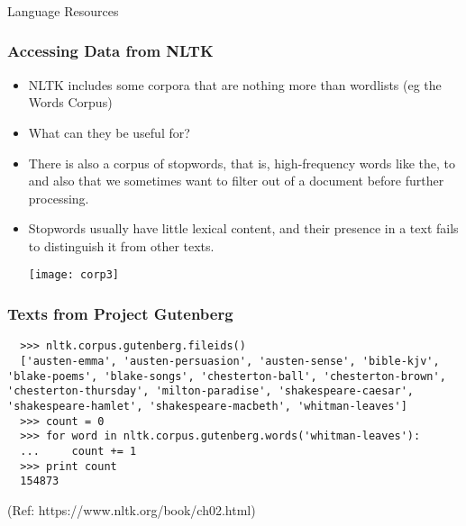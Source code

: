 \begin{frame}[fragile]\frametitle{}

\begin{center}
{\Large Language Resources}
\end{center}
\end{frame}

\begin{frame}[fragile]\frametitle{ Accessing Data from NLTK }
\begin{itemize}
\item NLTK includes some corpora that are nothing more than wordlists (eg the Words Corpus)
\item What can they be useful for?
\item There is also a corpus of stopwords, that is, high-frequency words like the, to and also that we sometimes want to filter out of a document before further processing. 
\item Stopwords usually have little lexical content, and their presence in a text fails to distinguish it from other texts.
\begin{center}
\texttt{[image: corp3]}
\end{center}
\end{itemize}
\end{frame}

\begin{frame}[fragile]\frametitle{Texts from Project Gutenberg}

{\small
\begin{lstlisting}
  >>> nltk.corpus.gutenberg.fileids()
  ['austen-emma', 'austen-persuasion', 'austen-sense', 'bible-kjv', 'blake-poems', 'blake-songs', 'chesterton-ball', 'chesterton-brown', 'chesterton-thursday', 'milton-paradise', 'shakespeare-caesar', 'shakespeare-hamlet', 'shakespeare-macbeth', 'whitman-leaves']
  >>> count = 0
  >>> for word in nltk.corpus.gutenberg.words('whitman-leaves'):
  ...     count += 1
  >>> print count
  154873
\end{lstlisting}}

{\tiny (Ref: https://www.nltk.org/book/ch02.html)}
\end{frame}

